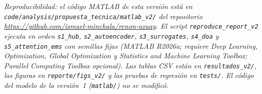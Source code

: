 \documentclass[11pt,a4paper]{article}
\begin{document}


\vspace{1em}
\noindent\small\textit{Reproducibilidad: el c\'odigo MATLAB de esta versi\'on est\'a en
\texttt{code/analysis/propuesta\_tecnica/matlab\_v2/} del repositorio
\url{https://github.com/ismael-minchala/renon-azuay}. El script
\texttt{reproduce\_report\_v2} ejecuta en orden \texttt{s1\_hub}, \texttt{s2\_autoencoder},
\texttt{s3\_surrogates}, \texttt{s4\_doa} y \texttt{s5\_attention\_ems} con semillas fijas
(MATLAB R2026a; requiere Deep Learning, Optimization, Global Optimization y Statistics and
Machine Learning Toolbox; Parallel Computing Toolbox opcional). Las tablas CSV est\'an en
\texttt{resultados\_v2/}, las figuras en \texttt{reporte/figs\_v2/} y las pruebas de
regresi\'on en \texttt{tests/}. El c\'odigo del modelo de la versi\'on~1 (\texttt{matlab/})
no se modific\'o.}
\end{document}
